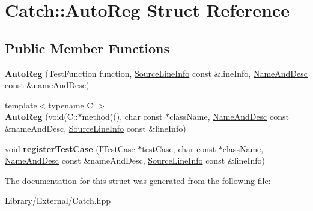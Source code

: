 \hypertarget{struct_catch_1_1_auto_reg}{}\section{Catch\+:\+:Auto\+Reg Struct Reference}
\label{struct_catch_1_1_auto_reg}
\subsection*{Public Member Functions}
\begin{DoxyCompactItemize}
\item 
\hypertarget{struct_catch_1_1_auto_reg_af224f4568d57b8652474df475a164a8c}{}{\bfseries Auto\+Reg} (Test\+Function function, \hyperlink{struct_catch_1_1_source_line_info}{Source\+Line\+Info} const \&line\+Info, \hyperlink{struct_catch_1_1_name_and_desc}{Name\+And\+Desc} const \&name\+And\+Desc)\label{struct_catch_1_1_auto_reg_af224f4568d57b8652474df475a164a8c}

\item 
\hypertarget{struct_catch_1_1_auto_reg_a1bf9207fe0a02b46dc0ab1cc03cbe738}{}{\footnotesize template$<$typename C $>$ }\\{\bfseries Auto\+Reg} (void(C\+::$\ast$method)(), char const $\ast$class\+Name, \hyperlink{struct_catch_1_1_name_and_desc}{Name\+And\+Desc} const \&name\+And\+Desc, \hyperlink{struct_catch_1_1_source_line_info}{Source\+Line\+Info} const \&line\+Info)\label{struct_catch_1_1_auto_reg_a1bf9207fe0a02b46dc0ab1cc03cbe738}

\item 
\hypertarget{struct_catch_1_1_auto_reg_a2dc6a03e838b31e29fcd6a740195b55b}{}void {\bfseries register\+Test\+Case} (\hyperlink{struct_catch_1_1_i_test_case}{I\+Test\+Case} $\ast$test\+Case, char const $\ast$class\+Name, \hyperlink{struct_catch_1_1_name_and_desc}{Name\+And\+Desc} const \&name\+And\+Desc, \hyperlink{struct_catch_1_1_source_line_info}{Source\+Line\+Info} const \&line\+Info)\label{struct_catch_1_1_auto_reg_a2dc6a03e838b31e29fcd6a740195b55b}

\end{DoxyCompactItemize}


The documentation for this struct was generated from the following file\+:\begin{DoxyCompactItemize}
\item 
Library/\+External/Catch.\+hpp\end{DoxyCompactItemize}
